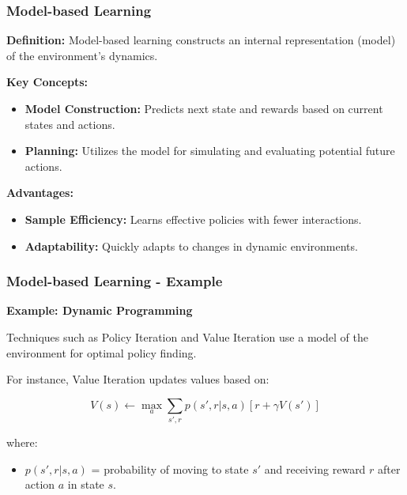 \documentclass[aspectratio=169]{beamer}
\begin{document}
\begin{frame}[fragile]
    \frametitle{Model-based Learning}
    
    \textbf{Definition:}
    Model-based learning constructs an internal representation (model) of the environment's dynamics.

    \textbf{Key Concepts:}
    \begin{itemize}
        \item \textbf{Model Construction:} Predicts next state and rewards based on current states and actions.
        \item \textbf{Planning:} Utilizes the model for simulating and evaluating potential future actions.
    \end{itemize}

    \textbf{Advantages:}
    \begin{itemize}
        \item \textbf{Sample Efficiency:} Learns effective policies with fewer interactions.
        \item \textbf{Adaptability:} Quickly adapts to changes in dynamic environments.
    \end{itemize}
\end{frame}

\begin{frame}[fragile]
    \frametitle{Model-based Learning - Example}

    \textbf{Example: Dynamic Programming}
    
    Techniques such as Policy Iteration and Value Iteration use a model of the environment for optimal policy finding.

    For instance, Value Iteration updates values based on:
    
    \begin{equation}
        V(s) \leftarrow \max_a \sum_{s', r} p(s', r | s, a) [r + \gamma V(s')]
    \end{equation}

    where:
    \begin{itemize}
        \item $p(s', r | s, a)$ = probability of moving to state $s'$ and receiving reward $r$ after action $a$ in state $s$.
    \end{itemize}
\end{frame}
\end{document}
